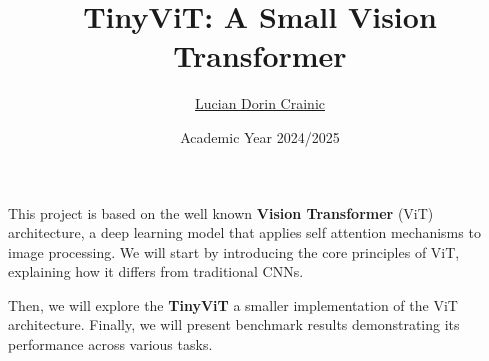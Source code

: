 \documentclass{beamer}
\title{TinyViT: A Small Vision Transformer}
\author{\href{mailto:crainic1938430@studenti.uniroma1.it}{Lucian Dorin Crainic}}
\date{Academic Year 2024/2025}
\begin{document}
\maketitle

\begin{frame}

  This project is based on the well known \textbf{Vision Transformer} (ViT) architecture, a deep learning model that applies self attention mechanisms to image processing. We will start by introducing the core principles of ViT, explaining how it differs from traditional CNNs.

  \vspace{\baselineskip}

  Then, we will explore the \textbf{TinyViT} a smaller implementation of the ViT architecture. Finally, we will present benchmark results demonstrating its performance across various tasks.

\end{frame}











\backmatter
\end{document}
